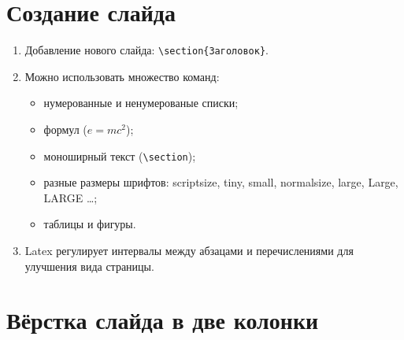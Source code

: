 \documentclass[12pt]{article}
\begin{document}
\section{Создание слайда}

\begin{enumerate}
\item Добавление нового слайда: \verb+\section{Заголовок}+.
\item Можно использовать множество команд:
\begin{itemize}
\item нумерованные и ненумерованые списки;
\item формул ($e=mc^2$);
\item моноширный текст (\verb+\section+);
\item разные размеры шрифтов: \scriptsize scriptsize, \tiny tiny, \small small,
\normalsize normalsize, \large large, \Large Large, \LARGE LARGE \normalsize\dots;
\item таблицы и фигуры.
\end{itemize}
\item Latex регулирует интервалы между абзацами и перечислениями для улучшения вида страницы.
\end{enumerate}

\section{Вёрстка слайда в две колонки}
\end{document}
